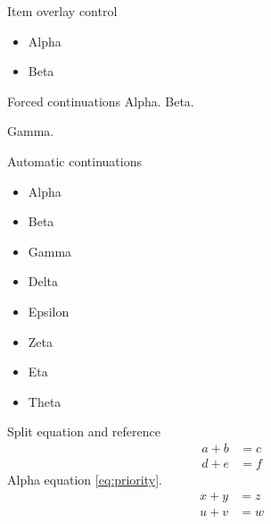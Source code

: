 \documentclass[aspectratio=169]{beamer}
\begin{document}
\begin{frame}{Item overlay control}
  \begin{itemize}
    \item<1-> Alpha
    \item<2-> Beta
  \end{itemize}
\end{frame}

\begin{frame}[allowframebreaks]{Forced continuations}
  Alpha.
  \newpage
  Beta.\par
  \framebreak
  Gamma.
\end{frame}

\begin{frame}[allowframebreaks=1]{Automatic continuations}
  \begin{itemize}
    \item \rule{0pt}{30pt}Alpha
    \item \rule{0pt}{30pt}Beta
    \item \rule{0pt}{30pt}Gamma
    \item \rule{0pt}{30pt}Delta
    \item \rule{0pt}{30pt}Epsilon
    \item \rule{0pt}{30pt}Zeta
    \item \rule{0pt}{30pt}Eta
    \item \rule{0pt}{30pt}Theta
  \end{itemize}
\end{frame}

\begin{frame}{Split equation and reference}
  \begin{equation}\label{eq:priority}
    \begin{split}
      a+b&=c\\
      d+e&=f
    \end{split}
  \end{equation}
  Alpha equation \ref{eq:priority}.
  \begin{equation}\begin{split}x+y&=z\\u+v&=w\end{split}\end{equation}
\end{frame}
\end{document}
